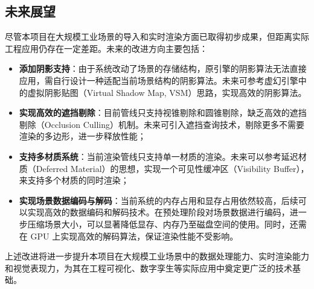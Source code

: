 \subsection{未来展望}

尽管本项目在大规模工业场景的导入和实时渲染方面已取得初步成果，但距离实际工程应用仍存在一定差距。未来的改进方向主要包括：

\begin{itemize}
    \item \textbf{添加阴影支持}：由于系统改动了场景的存储结构，原引擎的阴影算法无法直接应用，需自行设计一种适配当前场景结构的阴影算法。未来可参考虚幻引擎中的虚拟阴影贴图（Virtual Shadow Map, VSM）思路\cite{VSM}，实现高效的阴影算法。

    \item \textbf{实现高效的遮挡剔除}：目前管线只支持视锥剔除和圆锥剔除，缺乏高效的遮挡剔除（Occlusion Culling）机制。未来可引入遮挡查询技术，剔除更多不需要渲染的多边形，进一步释放性能\cite{coorg1997}；

    \item \textbf{支持多材质系统}：当前渲染管线只支持单一材质的渲染。未来可以参考延迟材质（Deferred Material）的思想，实现一个可见性缓冲区（Visibility Buffer），来支持多个材质的同时渲染\cite{burns2013}；

    \item \textbf{实现场景数据编码与解码}：当前系统的内存占用和显存占用依然较高，后续可以实现高效的数据编码和解码技术。在预处理阶段对场景数据进行编码，进一步压缩场景大小，可以显著降低显存、内存乃至磁盘空间的使用\cite{Mlakar2024}。同时，还需在 GPU 上实现高效的解码算法，保证渲染性能不受影响。
\end{itemize}

上述改进将进一步提升本项目在大规模工业场景中的数据处理能力、实时渲染能力和视觉表现力，为其在工程可视化、数字孪生等实际应用中奠定更广泛的技术基础。